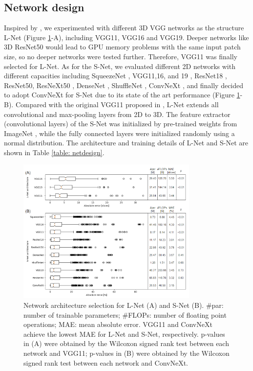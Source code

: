\subsection{Network design}
Inspired by \cite{Belharbi2017}, we experimented with different 3D VGG \cite{Simonyan2014} networks as the structure L-Net (Figure \ref{fig3}-A), including VGG11, VGG16 and VGG19. Deeper networks like 3D ResNet50 \cite{he2016deep} would lead to GPU memory problems with the same input patch size, so no deeper networks were tested further. Therefore, VGG11 was finally selected for L-Net. As for the S-Net, we evaluated different 2D networks with different capacities including SqueezeNet \cite{iandola2016squeezenet}, VGG11,16, and 19 \cite{Simonyan2014}, ResNet18 \cite{he2016deep}, ResNet50, ResNeXt50 \cite{xie2017aggregated}, DenseNet \cite{Huang2016}, ShuffleNet \cite{zhang2018shufflenet}, ConvNeXt \cite{Liu2022}, and finally decided to adopt ConvNeXt for S-Net due to its state of the art performance (Figure \ref{fig3}-B). Compared with the original VGG11 proposed in \cite{Simonyan2014}, L-Net extends all convolutional and max-pooling layers from 2D to 3D. The feature extractor (convolutional layers) of the S-Net was initialized by pre-trained weights from ImageNet \cite{Liu2022}, while the fully connected layers were initialized randomly using a normal distribution. The architecture and training details of L-Net and S-Net are shown in Table \ref{table: netdesign}.


\begin{figure}[tb]
    \centering
    \includegraphics[width=0.8\textwidth]{figure3.png}
    \caption{Network architecture selection for L-Net (A) and S-Net (B). \#par: number of trainable parameters; \#FLOPs: number of floating point operations; MAE: mean absolute error. VGG11 and ConvNeXt achieve the lowest MAE for L-Net and S-Net, respectively. p-values in (A) were obtained by the Wilcoxon signed rank test between each network and VGG11; p-values in (B) were obtained by the Wilcoxon signed rank test between each network and ConvNeXt.}
    \label{fig3}
\end{figure}

